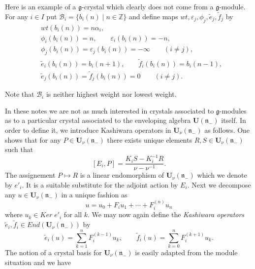 \documentclass[a4paper,10pt]{amsart}
\def\Z{\mathbb{Z}}
\def\U{\mathbf{U}}
\def\a{\alpha}
\def\g{\mathfrak{g}}
\def\n{\mathfrak{n}}
\numberwithin{equation}{section}
\begin{document}
\vspace{.1in}

Here is an example of a $\g$-crystal which clearly does not come from a $\g$-module. For any $i \in I$ put $\mathcal{B}_i=\{b_i(n)\;|\; n \in \Z\}$ and define maps $wt, \varepsilon_j, \phi_j, \tilde{e}_j, \tilde{f}_j$ by
\begin{align*}
&wt (b_i(n))=n\a_i,\\
&\phi_i(b_i(n))=n, \qquad \varepsilon_i(b_i(n))=-n,\\
&\phi_j(b_i(n))= \varepsilon_j(b_i(n))=-\infty \qquad (i \neq j),\\
&\tilde{e}_i(b_i(n))=b_i(n+1), \qquad \tilde{f}_i(b_i(n))=b_i(n-1),\\
&\tilde{e}_j(b_i(n))=\tilde{f}_j(b_i(n))=0 \qquad (i \neq j).
\end{align*}

Note that $\mathcal{B}_i$ is neither highest weight nor lowest weight.

\vspace{.1in}

In these notes we are not as much interested in crystals associated to $\g$-modules as to a particular crystal associated to the enveloping algebra $\U(\n_-)$ itself. In order to define it, we introduce Kashiwara operators in $\U_{\nu}(\n_-)$ as follows. One shows that for any $P \in \U_{\nu}(\n_-)$ there exists unique elements $R,S \in \U_{\nu}(\n_-)$ such that
$$[E_i,P]=\frac{K_i S-K_i^{-1}R}{\nu-\nu^{-1}}.$$
The assignement $P \mapsto R$ is a linear endomorphism of $\U_{\nu}(\n_-)$ which we denote by $e'_i$. It is a suitable substitute for the adjoint action by $E_i$. Next we decompose any $u \in \U_{\nu}(\n_-)$ in a unique fashion as
\begin{equation}\label{E:Kashops2}
u=u_0 + F_i u_1 + \cdots + F_i^{(n)} u_n
\end{equation}
where $u_k \in Ker\;e'_i$ for all $k$. We may now again define the \textit{Kashiwara operators} $\tilde{e}_i, \tilde{f}_i \in End(\U_{\nu}(\n_-))$ by
$$\tilde{e}_i(u)=\sum_{k=1}^n F_i^{(k-1)}u_k, \qquad \tilde{f}_i(u)=\sum_{k=0}^n F_i^{(k+1)}u_k.$$
The notion of a crystal basis for $\U_{\nu}(\n_-)$ is easily adapted from the module situation and we have

\vspace{.1in}
\end{document}
